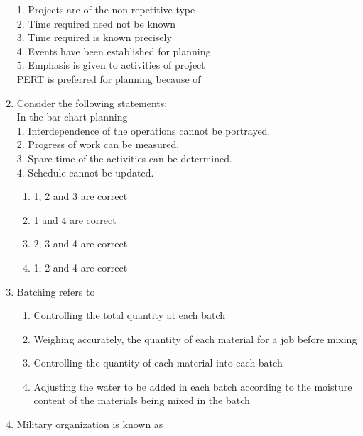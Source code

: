 \documentclass[11pt,a4paper]{article}
\begin{document}
\begin{enumerate}
{ 1. Projects are of the non-repetitive type \\
 2. Time required need not be known \\
 3. Time required is known precisely \\
 4. Events have been established for planning \\
 5. Emphasis is given to activities of project \\
 PERT is preferred for planning because of}
\\
\item{Consider the following statements: \\
 In the bar chart planning \\
 1. Interdependence of the operations cannot be portrayed. \\
 2. Progress of work can be measured. \\
 3. Spare time of the activities can be determined. \\
 4. Schedule cannot be updated.}
\begin{enumerate}[label=\Alph*.]
\item{1, 2 and 3 are correct}
\item{1 and 4 are correct}
\item{2, 3 and 4 are correct}
\item{1, 2 and 4 are correct}
\end{enumerate}
\item{Batching refers to}
\begin{enumerate}[label=\Alph*.]
\item{Controlling the total quantity at each batch}
\item{Weighing accurately, the quantity of each material for a job before mixing}
\item{Controlling the quantity of each material into each batch}
\item{Adjusting the water to be added in each batch according to the moisture content of the materials being mixed in the batch}
\end{enumerate}
\item{Military organization is known as}
\begin{enumerate}[label=\Alph*.]

\end{enumerate}
\end{enumerate}
\end{document}

